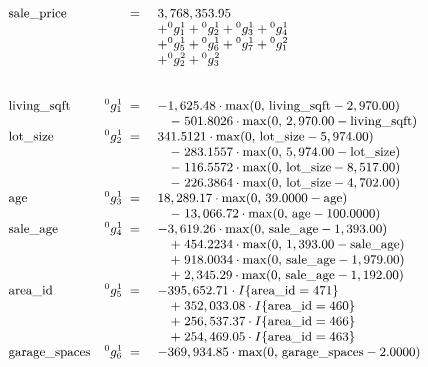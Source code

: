 \documentclass[
]{article}
\begin{document}
\[
 \small
\begin{array}{lrl}
  \text{sale\_price} & \;=\; & 3,768,353.95 \\
  & & + {}^{0}g^{1}_{1} + {}^{0}g^{1}_{2} + {}^{0}g^{1}_{3} + {}^{0}g^{1}_{4} \\
  & & + {}^{0}g^{1}_{5} + {}^{0}g^{1}_{6} + {}^{0}g^{1}_{7} + {}^{0}g^{2}_{1} \\
  & & + {}^{0}g^{2}_{2} + {}^{0}g^{2}_{3} \\
  & & \\ \\
  \text{living\_sqft} & {}^{0}g^{1}_{1} \;=\; & -1,625.48 \cdot \max(0,\, \text{living\_sqft} - 2,970.00) \\
  & & \quad - \; 501.8026 \cdot \max(0,\, 2,970.00 - \text{living\_sqft}) \\
  \text{lot\_size} & {}^{0}g^{1}_{2} \;=\; & 341.5121 \cdot \max(0,\, \text{lot\_size} - 5,974.00) \\
  & & \quad - \; 283.1557 \cdot \max(0,\, 5,974.00 - \text{lot\_size}) \\
  & & \quad - \; 116.5572 \cdot \max(0,\, \text{lot\_size} - 8,517.00) \\
  & & \quad - \; 226.3864 \cdot \max(0,\, \text{lot\_size} - 4,702.00) \\
  \text{age} & {}^{0}g^{1}_{3} \;=\; & 18,289.17 \cdot \max(0,\, 39.0000 - \text{age}) \\
  & & \quad - \; 13,066.72 \cdot \max(0,\, \text{age} - 100.0000) \\
  \text{sale\_age} & {}^{0}g^{1}_{4} \;=\; & -3,619.26 \cdot \max(0,\, \text{sale\_age} - 1,393.00) \\
  & & \quad + \; 454.2234 \cdot \max(0,\, 1,393.00 - \text{sale\_age}) \\
  & & \quad + \; 918.0034 \cdot \max(0,\, \text{sale\_age} - 1,979.00) \\
  & & \quad + \; 2,345.29 \cdot \max(0,\, \text{sale\_age} - 1,192.00) \\
  \text{area\_id} & {}^{0}g^{1}_{5} \;=\; & -395,652.71 \cdot I\{\text{area\_id} = \text{471}\} \\
  & & \quad + \; 352,033.08 \cdot I\{\text{area\_id} = \text{460}\} \\
  & & \quad + \; 256,537.37 \cdot I\{\text{area\_id} = \text{466}\} \\
  & & \quad + \; 254,469.05 \cdot I\{\text{area\_id} = \text{463}\} \\
  \text{garage\_spaces} & {}^{0}g^{1}_{6} \;=\; & -369,934.85 \cdot \max(0,\, \text{garage\_spaces} - 2.0000) \\

\end{array}\]
\end{document}
